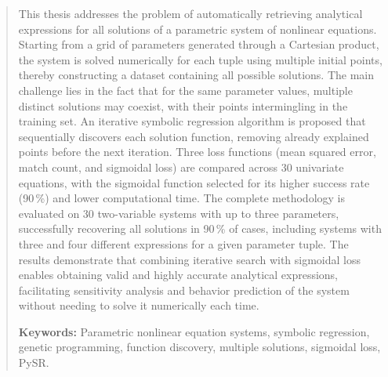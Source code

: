 \begin{abstract}
	This thesis addresses the problem of automatically retrieving analytical expressions for all solutions of a parametric system of nonlinear equations. Starting from a grid of parameters generated through a Cartesian product, the system is solved numerically for each tuple using multiple initial points, thereby constructing a dataset containing all possible solutions. The main challenge lies in the fact that for the same parameter values, multiple distinct solutions may coexist, with their points intermingling in the training set. An iterative symbolic regression algorithm is proposed that sequentially discovers each solution function, removing already explained points before the next iteration. Three loss functions (mean squared error, match count, and sigmoidal loss) are compared across 30 univariate equations, with the sigmoidal function selected for its higher success rate (90\,\%) and lower computational time. The complete methodology is evaluated on 30 two-variable systems with up to three parameters, successfully recovering all solutions in 90\,\% of cases, including systems with three and four different expressions for a given parameter tuple. The results demonstrate that combining iterative search with sigmoidal loss enables obtaining valid and highly accurate analytical expressions, facilitating sensitivity analysis and behavior prediction of the system without needing to solve it numerically each time.

	

	
	\textbf{Keywords:} Parametric nonlinear equation systems, symbolic regression, genetic programming, function discovery, multiple solutions, sigmoidal loss, PySR.
\end{abstract}